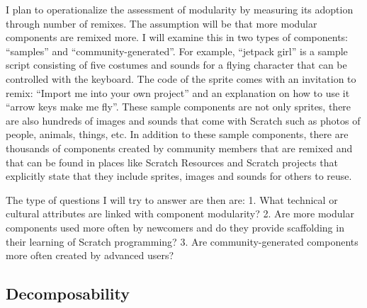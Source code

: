 I plan to operationalize the assessment of modularity by measuring its adoption through number of remixes.
The assumption will be that more modular components are remixed more.
I will examine this in two types of components:  ``samples'' and ``community-generated''.
For example, ``jetpack girl'' is a sample script consisting of five costumes and  sounds for a flying character that can be controlled with the keyboard.
The code of the sprite comes with an invitation to remix: ``Import me into your own project'' and an explanation on how to use it ``arrow keys make me fly''.
These sample components are not only sprites, there are also hundreds of images and sounds that come with Scratch such as photos of people, animals, things, etc.
In addition to these sample components, there are thousands of components created by community members that are remixed and that can be found in places like Scratch Resources and Scratch projects that explicitly state that they include sprites, images and sounds for others to reuse.

The type of questions I will try to answer are then are:
1. What technical or cultural attributes are linked with component modularity? 
2. Are more modular components used more often by newcomers and do they provide scaffolding in their learning of Scratch programming?
3. Are community-generated components more often created by advanced users?

\subsection{Decomposability}

